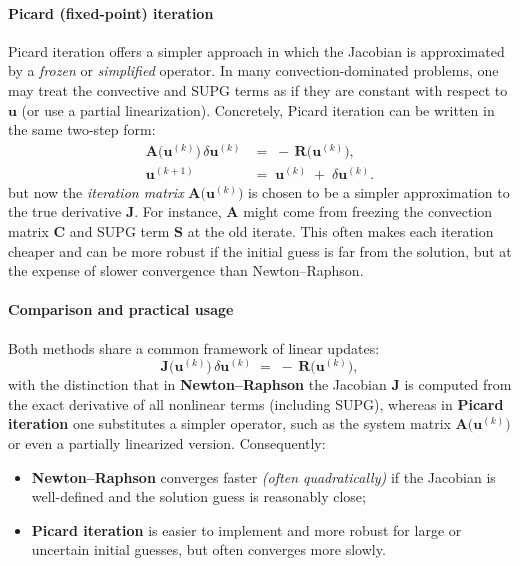 \paragraph{Picard (fixed-point) iteration}

Picard iteration offers a simpler approach in which the Jacobian is approximated by a \emph{frozen} or \emph{simplified} operator. In many convection-dominated problems, one may treat the convective and SUPG terms as if they are constant with respect to \(\mathbf{u}\) (or use a partial linearization). Concretely, Picard iteration can be written in the same two-step form:
\begin{subequations}
\begin{align}
\mathbf{A}\bigl(\mathbf{u}^{(k)}\bigr)\,\delta \mathbf{u}^{(k)}
&=\;
-\,\mathbf{R}\bigl(\mathbf{u}^{(k)}\bigr),
\\
\mathbf{u}^{(k+1)} 
&=\;
\mathbf{u}^{(k)} 
\;+\;
\delta \mathbf{u}^{(k)}.
\end{align}
\end{subequations}
but now the \emph{iteration matrix} \(\mathbf{A}\bigl(\mathbf{u}^{(k)}\bigr)\) is chosen to be a simpler approximation to the true derivative \(\mathbf{J}\). For instance, \(\mathbf{A}\) might come from freezing the convection matrix \(\mathbf{C}\) and SUPG term \(\mathbf{S}\) at the old iterate. This often makes each iteration cheaper and can be more robust if the initial guess is far from the solution, but at the expense of slower convergence than Newton--Raphson.

\paragraph{Comparison and practical usage}

Both methods share a common framework of linear updates:
\begin{equation}
\mathbf{J}\bigl(\mathbf{u}^{(k)}\bigr)\,\delta\mathbf{u}^{(k)}
\;=\;
-\,\mathbf{R}\bigl(\mathbf{u}^{(k)}\bigr),
\end{equation}
with the distinction that in \textbf{Newton--Raphson} the Jacobian \(\mathbf{J}\) is computed from the exact derivative of all nonlinear terms (including SUPG), whereas in \textbf{Picard iteration} one substitutes a simpler operator, such as the system matrix \(\mathbf{A}\bigl(\mathbf{u}^{(k)}\bigr)\) or even a partially linearized version. Consequently:
\begin{itemize}
    \item \textbf{Newton--Raphson} converges faster \textit{(often quadratically)} if the Jacobian is well-defined and the solution guess is reasonably close;
    \item \textbf{Picard iteration} is easier to implement and more robust for large or uncertain initial guesses, but often converges more slowly.
\end{itemize}

